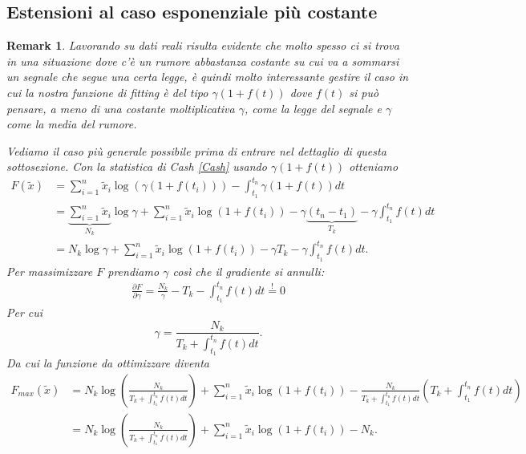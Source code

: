 \documentclass[10pt,a4paper]{report}
\newtheorem{remark}{Remark}
\begin{document}
\subsection{Estensioni al caso esponenziale più costante}
\begin{remark}
Lavorando su dati reali risulta evidente che molto spesso ci si trova in una situazione dove c'è un rumore abbastanza costante su cui va a sommarsi un segnale che segue una certa legge, è quindi molto interessante gestire il caso in cui la nostra funzione di fitting è del tipo $\gamma(1+f(t))$ dove $f(t)$ si può pensare, a meno di una costante moltiplicativa $\gamma$, come la legge del segnale e $\gamma$ come la media del rumore. 

Vediamo il caso più generale possibile prima di entrare nel dettaglio di questa sottosezione. Con la statistica di Cash \eqref{Cash} usando $\gamma(1+f(t))$ otteniamo
\begin{align}
F(\tilde{x}) &= \sum_{i=1}^n\tilde{x}_i\log(\gamma(1+f(t_i)))-\int_{t_1}^{t_n}\gamma(1+f(t)) dt \nonumber\\
&= \underbrace{\sum_{i=1}^n\tilde{x}_i}_{N_k}\log\gamma + \sum_{i=1}^n\tilde{x}_i\log(1+f(t_i))-\gamma\underbrace{(t_n-t_1)}_{T_k}-\gamma\int_{t_1}^{t_n}f(t) dt\nonumber\\
&= N_k\log\gamma + \sum_{i=1}^n\tilde{x}_i\log(1+f(t_i)) -\gamma T_k -\gamma\int_{t_1}^{t_n}f(t) dt.\label{cash_gamma}
\end{align}
Per massimizzare $F$ prendiamo $\gamma$ così che il gradiente si annulli:
\begin{gather*}
\frac{\partial F}{\partial\gamma}=\frac{N_k}{\gamma}-T_k-\int_{t_1}^{t_n}f(t) dt\stackrel{!}{=}0
\end{gather*}
Per cui
$$
\gamma = \frac{N_k}{T_k+\int_{t_1}^{t_n}f(t)dt}.
$$
Da cui la funzione da ottimizzare diventa
\begin{align}\nonumber
F_{max}(\tilde{x}) &= N_k\log\left(\frac{N_k}{T_k+\int_{t_1}^{t_n}f(t)dt}\right) + \sum_{i=1}^n\tilde{x}_i\log(1+f(t_i)) -\frac{N_k}{T_k+\int_{t_1}^{t_n}f(t)dt} \left(T_k +\int_{t_1}^{t_n}f(t) dt\right)\\
&= N_k\log\left(\frac{N_k}{T_k+\int_{t_1}^{t_n}f(t)dt}\right) + \sum_{i=1}^n\tilde{x}_i\log(1+f(t_i)) -N_k.\label{c_plus_cash_max}
\end{align}
\end{remark}
\end{document}
